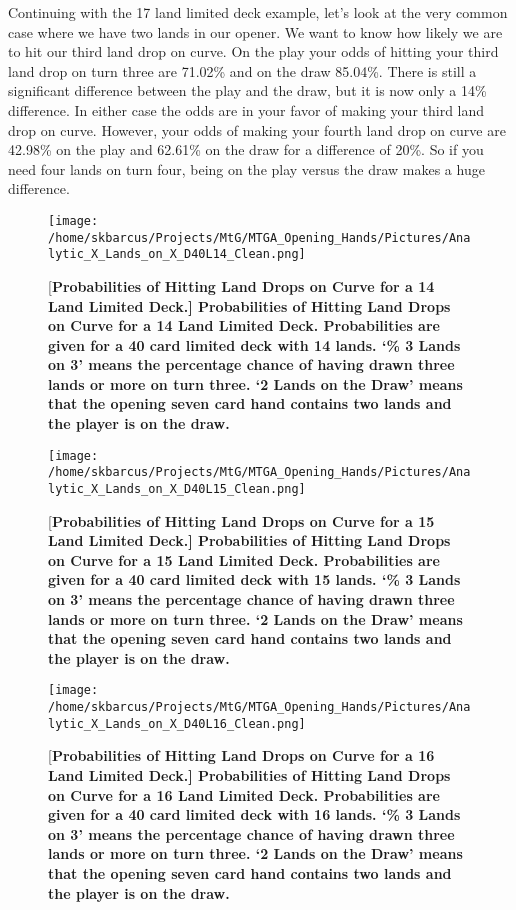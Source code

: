 \documentclass[oneside]{book}   %
\begin{document}
Continuing with the 17 land limited deck example, let's look at the very common case where we have two lands in our opener. We want to know how likely we are to hit our third land drop on curve. On the play your odds of hitting your third land drop on turn three are 71.02\% and on the draw 85.04\%. There is still a significant difference between the play and the draw, but it is now only a 14\% difference. In either case the odds are in your favor of making your third land drop on curve. However, your odds of making your fourth land drop on curve are 42.98\% on the play and 62.61\% on the draw for a difference of 20\%. So if you need four lands on turn four, being on the play versus the draw makes a huge difference.

 	\begin{figure}[!ht]
	\centering
	\centerline{\texttt{[image: /home/skbarcus/Projects/MtG/MTGA\_Opening\_Hands/Pictures/Analytic\_X\_Lands\_on\_X\_D40L14\_Clean.png]}}
	[\bf{Probabilities of Hitting Land Drops on Curve for a 14 Land Limited Deck.}]{
	{\bf{Probabilities of Hitting Land Drops on Curve for a 14 Land Limited Deck.}} Probabilities are given for a 40 card limited deck with 14 lands. `\% 3 Lands on 3' means the percentage chance of having drawn three lands or more on turn three. `2 Lands on the Draw' means that the opening seven card hand contains two lands and the player is on the draw.}
	\label{fig:14_curve}
	\end{figure}	
	
	\begin{figure}[!ht]
	\centering
	\centerline{\texttt{[image: /home/skbarcus/Projects/MtG/MTGA\_Opening\_Hands/Pictures/Analytic\_X\_Lands\_on\_X\_D40L15\_Clean.png]}}
	[\bf{Probabilities of Hitting Land Drops on Curve for a 15 Land Limited Deck.}]{
	{\bf{Probabilities of Hitting Land Drops on Curve for a 15 Land Limited Deck.}} Probabilities are given for a 40 card limited deck with 15 lands. `\% 3 Lands on 3' means the percentage chance of having drawn three lands or more on turn three. `2 Lands on the Draw' means that the opening seven card hand contains two lands and the player is on the draw.}
	\label{fig:15_curve}
	\end{figure}	
	
	\begin{figure}[!ht]
	\centering
	\centerline{\texttt{[image: /home/skbarcus/Projects/MtG/MTGA\_Opening\_Hands/Pictures/Analytic\_X\_Lands\_on\_X\_D40L16\_Clean.png]}}
	[\bf{Probabilities of Hitting Land Drops on Curve for a 16 Land Limited Deck.}]{
	{\bf{Probabilities of Hitting Land Drops on Curve for a 16 Land Limited Deck.}} Probabilities are given for a 40 card limited deck with 16 lands. `\% 3 Lands on 3' means the percentage chance of having drawn three lands or more on turn three. `2 Lands on the Draw' means that the opening seven card hand contains two lands and the player is on the draw.}
	\label{fig:16_curve}
	\end{figure}	
	
\end{document}
